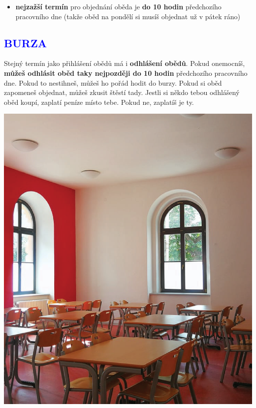 \documentclass[a5paper, twoside]{article}
\newcommand{\boxik}[2]{
  \begin{tcolorbox}[
    sharp corners,
    colback = #1,
    boxrule = 0pt,
    grow to left by = 25pt,
    grow to right by = 25pt,
    right = 22pt,
    left = 22pt%
  ]
    #2
  \end{tcolorbox}
}
\newcommand{\podnadpis}[2]{
  \subsection*{\textcolor{#2}{#1}}
}
\begin{document}
\vspace{-9pt}
\begin{minipage}{\linewidth}
  \begin{minipage}{.64\linewidth}
    \vspace*{4pt}
    \begin{itemize}[leftmargin=10pt]
      \item \textbf{nejzažší termín} pro objednání oběda je \textbf{do 10 hodin} předchozího pracovního dne (takže oběd na pondělí si musíš objednat už v pátek ráno)
    \end{itemize}

    \vspace*{5pt}\podnadpis{BURZA}{blue}
    \vspace*{10pt} Stejný termín jako přihlášení obědů má i \textbf{odhlášení obědů}. Pokud onemocníš, \textbf{můžeš odhlásit oběd taky nejpozději do 10 hodin} předchozího pracovního dne. Pokud to nestihneš, můžeš ho pořád hodit do burzy. Pokud si oběd zapomeneš objednat, můžeš zkusit štěstí tady. Jestli si někdo tebou odhlášený oběd koupí, zaplatí peníze místo tebe. Pokud ne, zaplatíš je ty.
  \end{minipage}
  \hfill
  \begin{minipage}{.26\linewidth}
    \boxik{blue}{
    \hspace*{-20pt}
    \includegraphics[width=1.29\linewidth]{jidelna.png}
    \vfill}
  \end{minipage}
\end{minipage}
\end{document}
